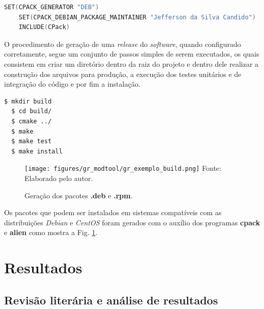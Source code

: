 \documentclass[
  12pt,				%
  openright,			%
  twoside,			%
  a4paper,			%
  english,			%
  french,				%
  spanish,			%
  brazil,				%
  ]{abntex2}
\begin{document}
\begin{adjustbox}{max width=\linewidth}
  \begin{lstlisting}[language=C++]
    SET(CPACK_GENERATOR "DEB")
    SET(CPACK_DEBIAN_PACKAGE_MAINTAINER "Jefferson da Silva Candido")
    INCLUDE(CPack)
  \end{lstlisting}
\end{adjustbox}

O procedimento de geração de uma \textit{release} do \textit{software}, quando configurado corretamente, segue um conjunto de passos simples de serem executados, os quais consistem em criar um diretório
dentro da raiz do projeto e dentro dele realizar a construção dos arquivos para produção, a execução dos testes unitários e de integração do código e por fim a instalação.

\begin{adjustbox}{max width=\linewidth}
  \begin{lstlisting}[language=bash]
  $ mkdir build
  $ cd build/
  $ cmake ../
  $ make
  $ make test
  $ make install
  \end{lstlisting}
\end{adjustbox}

\begin{figure}[!htb]
  \centering
  \caption{Geração dos pacotes \textbf{.deb} e \textbf{.rpm}.}
  \texttt{[image: figures/gr\_modtool/gr\_exemplo\_build.png]}
  Fonte: Elaborado pelo autor.
  \label{fig:gr_exemplo_build}
\end{figure}

\newpage
Os pacotes que podem ser instalados em sistemas compatíveis com as distribuições \textit{Debian} e \textit{CentOS} foram gerados com o auxílio dos programas \textbf{cpack} e \textbf{alien} como mostra a
Fig. \ref{fig:gr_exemplo_build}.

\part{Resultados}

\chapter{Revisão literária e análise de resultados}
\end{document}
